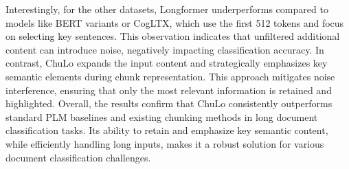 \documentclass[11pt]{article}
\begin{document}
Interestingly, for the other datasets, Longformer underperforms compared to models like BERT variants or CogLTX, which use the first 512 tokens and focus on selecting key sentences. This observation indicates that unfiltered additional content can introduce noise, negatively impacting classification accuracy. In contrast, ChuLo expands the input content and strategically emphasizes key semantic elements during chunk representation. This approach mitigates noise interference, ensuring that only the most relevant information is retained and highlighted. 
Overall, the results confirm that ChuLo consistently outperforms standard PLM baselines and existing chunking methods in long document classification tasks. Its ability to retain and emphasize key semantic content, while efficiently handling long inputs, makes it a robust solution for various document classification challenges.



\end{document}
